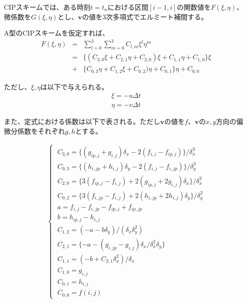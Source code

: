 \documentclass[twocolumn,oneside,a4paper]{article}
\begin{document}
CIPスキームでは、ある時刻$t=t_n$における区間$[i-1,i]$の関数値を$F(\xi,\eta)$、微係数を$G(\xi,\eta)$とし、$\bm v$の値を3次多項式でエルミート補間する。

A型のCIPスキームを仮定すれば、
\begin{eqnarray*}
F(\xi,\eta) &=& \sum_{l=0}^3 \sum_{m=0}^3 C_{l,m} \xi^l \eta^m \\
&=& \{ ( C_{3,0} \xi + C_{2,1}\eta + C_{2,0}) \xi + C_{1,1}\eta + C_{1,0} \} \xi \\
 &+& \{C_{0,3}\eta + C_{1,2}\xi + C_{0,2})\eta + C_{0,1}\} \eta + C_{0,0}
\end{eqnarray*}

ただし、$\xi,\eta$は以下で与えられる。
\begin{eqnarray*}
\xi =  -u \Delta t\\
\eta = -v \Delta t
\end{eqnarray*}

また、定式における係数は以下で表される。ただし$\bm v$の値を$f$、$\bm{v}$の$x,y$方向の偏微分係数をそれぞれ$g,h$とする。

\begin{eqnarray*}
\begin{cases}
\;C_{3,0} = \{ (g_{ip,j} + g_{i,j}) \delta_x - 2(f_{i,j}-f_{ip,j})\}/ \delta_x^3 \\
\;C_{0,3} = \{ (h_{i,jp} + h_{i,j}) \delta_y - 2(f_{i,j}-f_{i,jp})\}/ \delta_y^3 \\
\;C_{2,0} = \{ 3(f_{ip,j} - f_{i,j})  + 2(g_{ip,j}+2g_{i,j}) \delta_x \}/ \delta_x^2 \\
\;C_{0,2} = \{ 3(f_{i,jp} - f_{i,j})  + 2(h_{i,jp}+2h_{i,j}) \delta_y \}/ \delta_y^2 \\
\;a = f_{i,j} - f_{i,jp} - f_{ip,j} + f_{ip,jp} \\
\;b = h_{ip,j} - h_{i,j} \\
\;C_{1,2} = (-a-b\delta_y) / (\delta_x \delta_y^2)\\
\;C_{2,1} = \{  -a-(g_{i,jp} - g_{i,j})  \delta_x / \delta_x^2 \delta_y  \}\\
\;C_{1,1} = (-b+C_{2,1}\delta_x^2)/\delta_x\\
\;C_{1,0} = g_{i,j} \\
\;C_{0,1} = h_{i,j} \\
\;C_{0,0} = f(i,j)

\end{cases}  
\end{eqnarray*}
\end{document}
